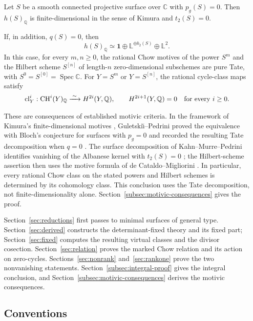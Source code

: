 \begin{corollary}\label{cor:tate-motives}
Let \(S\) be a smooth connected projective surface over \(\mathbb C\)
with \(p_g(S)=0\). Then \(h(S)_{\mathbb Q}\) is finite-dimensional in
the sense of Kimura and \(t_2(S)=0\).

If, in addition, \(q(S)=0\), then
\[
h(S)_{\mathbb Q}\simeq
\mathbf 1\oplus\mathbb L^{\oplus b_2(S)}\oplus\mathbb L^2.
\]
In this case, for every \(m,n\ge0\), the rational Chow motives of the
power \(S^m\) and the Hilbert scheme \(S^{[n]}\) of length-\(n\)
zero-dimensional subschemes are pure Tate, with
\(S^0=S^{[0]}=\operatorname{Spec}\mathbb C\).
For \(Y=S^m\) or \(Y=S^{[n]}\), the rational cycle-class maps satisfy
\[
\operatorname{cl}_Y^i:\operatorname{CH}^i(Y)_{\mathbb Q}
 \xrightarrow{\;\sim\;}H^{2i}(Y,\mathbb Q),
\qquad H^{2i+1}(Y,\mathbb Q)=0
\quad\text{for every }i\ge0.
\]
\end{corollary}

These are consequences of established motivic criteria. In the framework
of Kimura's finite-dimensional motives \cite{Kimura},
Guletski\u\i--Pedrini proved the equivalence with Bloch's conjecture
for surfaces with $p_g=0$ and recorded the resulting Tate decomposition when
$q=0$ \cite[Theorem~27 and Remark~28]{GuletskiiPedrini}.
The surface decomposition of Kahn--Murre--Pedrini identifies vanishing
of the Albanese kernel with $t_2(S)=0$ \cite{KMP}; the Hilbert-scheme
assertion then uses
the motive formula of de Cataldo--Migliorini \cite{deCataldoMigliorini}.
In particular, every rational Chow class on the stated powers and Hilbert
schemes is determined by its cohomology class. This conclusion uses
the Tate decomposition, not finite-dimensionality alone.
Section~\ref{subsec:motivic-consequences} gives the proof.

Section~\ref{sec:reductions}
first passes to minimal surfaces of general type.
Section~\ref{sec:derived} constructs the determinant-fixed theory
and its fixed part; Section~\ref{sec:fixed} computes the resulting
virtual classes and the divisor cosection.  Section~\ref{sec:relation}
proves the marked Chow relation and its action on zero-cycles.
Sections~\ref{sec:nonrank} and~\ref{sec:rankone} prove the two
nonvanishing statements. Section~\ref{subsec:integral-proof} gives the
integral conclusion, and Section~\ref{subsec:motivic-consequences}
derives the motivic consequences.

\subsection*{Conventions}

